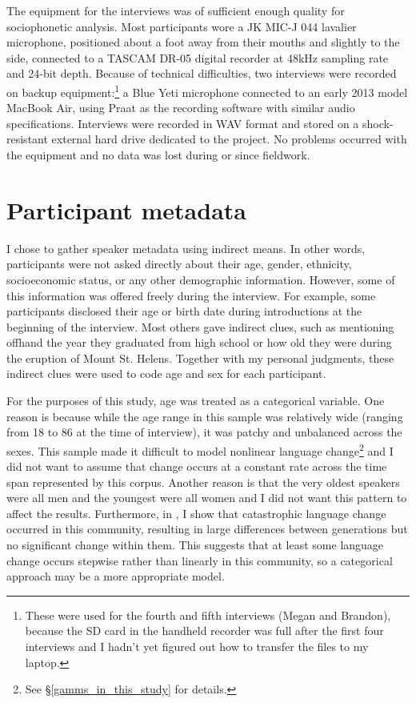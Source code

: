 The equipment for the interviews was of sufficient enough quality for sociophonetic analysis. Most participants wore a JK MIC-J 044 lavalier microphone, positioned about a foot away from their mouths and slightly to the side, connected to a TASCAM DR-05 digital recorder at 48kHz sampling rate and 24-bit depth. Because of technical difficulties, two interviews were recorded on backup equipment:\footnote{These were used for the fourth and fifth interviews (Megan and Brandon), because the SD card in the handheld recorder was full after the first four interviews and I hadn’t yet figured out how to transfer the files to my laptop.} a Blue Yeti microphone connected to an early 2013 model MacBook Air, using Praat \citep{boersma_weenink_2018_praat} as the recording software with similar audio specifications. Interviews were recorded in WAV format and stored on a shock-resistant external hard drive dedicated to the project. No problems occurred with the equipment and no data was lost during or since fieldwork.



\section{Participant metadata}
\label{participant_metadata}

I chose to gather speaker metadata using indirect means. In other words, participants were not asked directly about their age, gender, ethnicity, socioeconomic status, or any other demographic information. However, some of this information was offered freely during the interview. For example, some participants disclosed their age or birth date during introductions at the beginning of the interview. Most others gave indirect clues, such as mentioning offhand the year they graduated from high school or how old they were during the eruption of Mount St. Helens. Together with my personal judgments, these indirect clues were used to code age and sex for each participant.

For the purposes of this study, age was treated as a categorical variable. One reason is because while the age range in this sample was relatively wide (ranging from 18 to 86 at the time of interview), it was patchy and unbalanced across the sexes. This sample made it difficult to model nonlinear language change\footnote{See \S\ref{gamms_in_this_study} for details.} and I did not want to assume that change occurs at a constant rate across the time span represented by this corpus. Another reason is that the very oldest speakers were all men and the youngest were all women and I did not want this pattern to affect the results. Furthermore, in \citet{stanley_2018_pwpl}, I show that catastrophic language change occurred in this community, resulting in large differences between generations but no significant change within them. This suggests that at least some language change occurs stepwise rather than linearly in this community, so a categorical approach may be a more appropriate model.

